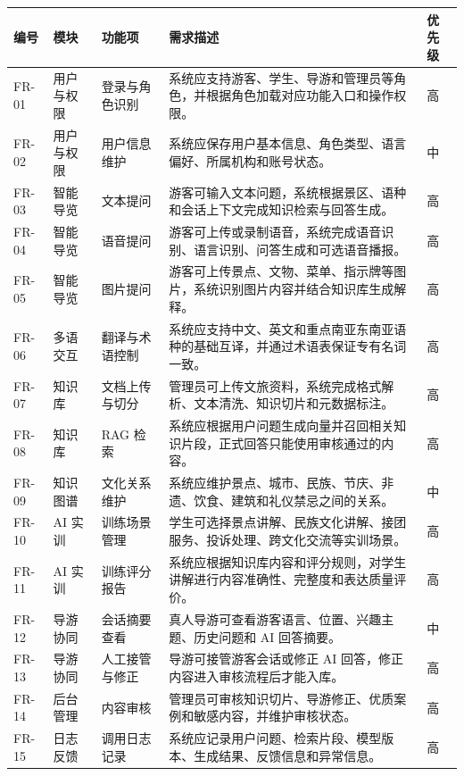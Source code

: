 \begin{longtable}{@{}p{1.35cm}p{2.05cm}p{3.15cm}p{5.35cm}p{1.15cm}@{}}
\toprule
编号 & 模块 & 功能项 & 需求描述 & 优先级 \\
\midrule
FR-01 & 用户与权限 & 登录与角色识别 & 系统应支持游客、学生、导游和管理员等角色，并根据角色加载对应功能入口和操作权限。 & 高 \\
FR-02 & 用户与权限 & 用户信息维护 & 系统应保存用户基本信息、角色类型、语言偏好、所属机构和账号状态。 & 中 \\
FR-03 & 智能导览 & 文本提问 & 游客可输入文本问题，系统根据景区、语种和会话上下文完成知识检索与回答生成。 & 高 \\
FR-04 & 智能导览 & 语音提问 & 游客可上传或录制语音，系统完成语音识别、语言识别、问答生成和可选语音播报。 & 高 \\
FR-05 & 智能导览 & 图片提问 & 游客可上传景点、文物、菜单、指示牌等图片，系统识别图片内容并结合知识库生成解释。 & 高 \\
FR-06 & 多语交互 & 翻译与术语控制 & 系统应支持中文、英文和重点南亚东南亚语种的基础互译，并通过术语表保证专有名词一致。 & 高 \\
FR-07 & 知识库 & 文档上传与切分 & 管理员可上传文旅资料，系统完成格式解析、文本清洗、知识切片和元数据标注。 & 高 \\
FR-08 & 知识库 & RAG 检索 & 系统应根据用户问题生成向量并召回相关知识片段，正式回答只能使用审核通过的内容。 & 高 \\
FR-09 & 知识图谱 & 文化关系维护 & 系统应维护景点、城市、民族、节庆、非遗、饮食、建筑和礼仪禁忌之间的关系。 & 中 \\
FR-10 & AI 实训 & 训练场景管理 & 学生可选择景点讲解、民族文化讲解、接团服务、投诉处理、跨文化交流等实训场景。 & 高 \\
FR-11 & AI 实训 & 训练评分报告 & 系统应根据知识库内容和评分规则，对学生讲解进行内容准确性、完整度和表达质量评价。 & 高 \\
FR-12 & 导游协同 & 会话摘要查看 & 真人导游可查看游客语言、位置、兴趣主题、历史问题和 AI 回答摘要。 & 中 \\
FR-13 & 导游协同 & 人工接管与修正 & 导游可接管游客会话或修正 AI 回答，修正内容进入审核流程后才能入库。 & 高 \\
FR-14 & 后台管理 & 内容审核 & 管理员可审核知识切片、导游修正、优质案例和敏感内容，并维护审核状态。 & 高 \\
FR-15 & 日志反馈 & 调用日志记录 & 系统应记录用户问题、检索片段、模型版本、生成结果、反馈信息和异常信息。 & 高 \\
\bottomrule
\end{longtable}

